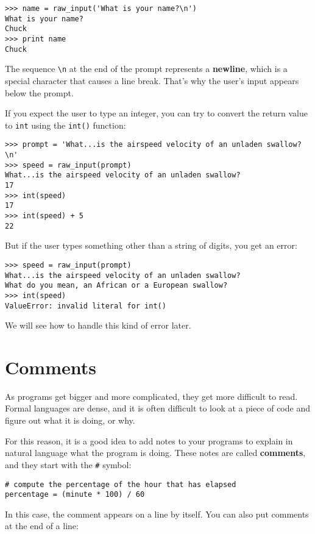 \begin{ex}

\beforeverb
\begin{verbatim}
>>> name = raw_input('What is your name?\n')
What is your name?
Chuck
>>> print name
Chuck
\end{verbatim}
\afterverb
%
The sequence \verb"\n" at the end of the prompt represents a {\bf newline},
which is a special character that causes a line break.
That's why the user's input appears below the prompt.


If you expect the user to type an integer, you can try to convert
the return value to {\tt int} using the {\tt int()} function:

\beforeverb
\begin{verbatim}
>>> prompt = 'What...is the airspeed velocity of an unladen swallow?\n'
>>> speed = raw_input(prompt)
What...is the airspeed velocity of an unladen swallow?
17
>>> int(speed)
17
>>> int(speed) + 5
22
\end{verbatim}
\afterverb
%
But if the user types something other than a string of digits,
you get an error:

\beforeverb
\begin{verbatim}
>>> speed = raw_input(prompt)
What...is the airspeed velocity of an unladen swallow?
What do you mean, an African or a European swallow?
>>> int(speed)
ValueError: invalid literal for int()
\end{verbatim}
\afterverb
%
We will see how to handle this kind of error later.



\section{Comments}

As programs get bigger and more complicated, they get more difficult
to read.  Formal languages are dense, and it is often difficult to
look at a piece of code and figure out what it is doing, or why.

For this reason, it is a good idea to add notes to your programs to explain
in natural language what the program is doing.  These notes are called
{\bf comments}, and they start with the \verb"#" symbol:

\beforeverb
\begin{verbatim}
# compute the percentage of the hour that has elapsed
percentage = (minute * 100) / 60
\end{verbatim}
\afterverb
%
In this case, the comment appears on a line by itself.  You can also put
comments at the end of a line:


\end{ex}
